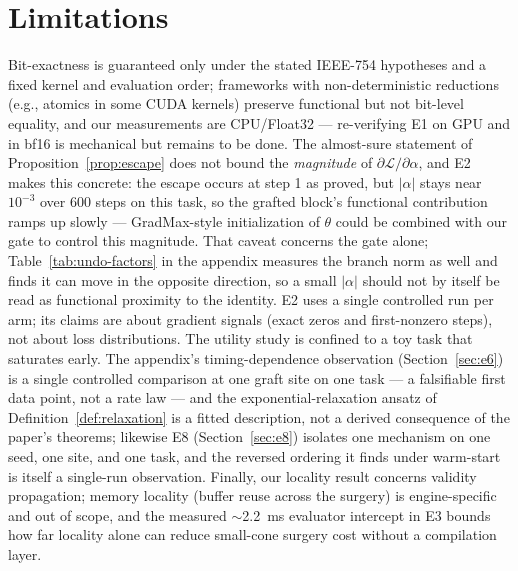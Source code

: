 \documentclass[11pt,a4paper]{article}
\newcommand{\Loss}{\mathcal{L}}
\begin{document}
\section{Limitations}
\label{sec:limitations}
Bit-exactness is guaranteed only under the stated IEEE-754 hypotheses and a fixed kernel and evaluation order; frameworks with non-deterministic reductions (e.g., atomics in some CUDA kernels) preserve functional but not bit-level equality, and our measurements are CPU\slash Float32 --- re-verifying E1 on GPU and in bf16 is mechanical but remains to be done. The almost-sure statement of Proposition~\ref{prop:escape} does not bound the \emph{magnitude} of $\partial\Loss/\partial\alpha$, and E2 makes this concrete: the escape occurs at step 1 as proved, but $|\alpha|$ stays near $10^{-3}$ over 600 steps on this task, so the grafted block's functional contribution ramps up slowly --- GradMax-style \cite{gradmax} initialization of $\theta$ could be combined with our gate to control this magnitude. That caveat concerns the gate alone; Table~\ref{tab:undo-factors} in the appendix measures the branch norm as well and finds it can move in the opposite direction, so a small $|\alpha|$ should not by itself be read as functional proximity to the identity. E2 uses a single controlled run per arm; its claims are about gradient signals (exact zeros and first-nonzero steps), not about loss distributions. The utility study is confined to a toy task that saturates early. The appendix's timing-dependence observation (Section~\ref{sec:e6}) is a single controlled comparison at one graft site on one task --- a falsifiable first data point, not a rate law --- and the exponential-relaxation ansatz of Definition~\ref{def:relaxation} is a fitted description, not a derived consequence of the paper's theorems; likewise E8 (Section~\ref{sec:e8}) isolates one mechanism on one seed, one site, and one task, and the reversed ordering it finds under warm-start is itself a single-run observation. Finally, our locality result concerns validity propagation; memory locality (buffer reuse across the surgery) is engine-specific and out of scope, and the measured $\sim$2.2~ms evaluator intercept in E3 bounds how far locality alone can reduce small-cone surgery cost without a compilation layer.
\end{document}
